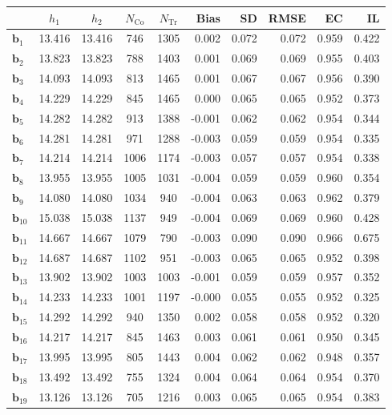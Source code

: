 \documentclass[10pt]{article}
\newcommand{\bb}{\mathbf{b}}
\begin{document}
\begin{table}[p]
    \centering
\begin{tabular}{lccccrrrrr}
\toprule\toprule
 & $h_1$ & $h_2$ & $N_{\mathrm{Co}}$ & $N_{\mathrm{Tr}}$ & Bias & SD & RMSE & EC & IL \\
\midrule
$\bb_{1}$ & 13.416 & 13.416 & 746 & 1305 & 0.002 & 0.072 & 0.072 & 0.959 & 0.422 \\
$\bb_{2}$ & 13.823 & 13.823 & 788 & 1403 & 0.001 & 0.069 & 0.069 & 0.955 & 0.403 \\
$\bb_{3}$ & 14.093 & 14.093 & 813 & 1465 & 0.001 & 0.067 & 0.067 & 0.956 & 0.390 \\
$\bb_{4}$ & 14.229 & 14.229 & 845 & 1465 & 0.000 & 0.065 & 0.065 & 0.952 & 0.373 \\
$\bb_{5}$ & 14.282 & 14.282 & 913 & 1388 & -0.001 & 0.062 & 0.062 & 0.954 & 0.344 \\
$\bb_{6}$ & 14.281 & 14.281 & 971 & 1288 & -0.003 & 0.059 & 0.059 & 0.954 & 0.335 \\
$\bb_{7}$ & 14.214 & 14.214 & 1006 & 1174 & -0.003 & 0.057 & 0.057 & 0.954 & 0.338 \\
$\bb_{8}$ & 13.955 & 13.955 & 1005 & 1031 & -0.004 & 0.059 & 0.059 & 0.960 & 0.354 \\
$\bb_{9}$ & 14.080 & 14.080 & 1034 & 940 & -0.004 & 0.063 & 0.063 & 0.962 & 0.379 \\
$\bb_{10}$ & 15.038 & 15.038 & 1137 & 949 & -0.004 & 0.069 & 0.069 & 0.960 & 0.428 \\
$\bb_{11}$ & 14.667 & 14.667 & 1079 & 790 & -0.003 & 0.090 & 0.090 & 0.966 & 0.675 \\
$\bb_{12}$ & 14.687 & 14.687 & 1102 & 951 & -0.003 & 0.065 & 0.065 & 0.952 & 0.398 \\
$\bb_{13}$ & 13.902 & 13.902 & 1003 & 1003 & -0.001 & 0.059 & 0.059 & 0.957 & 0.352 \\
$\bb_{14}$ & 14.233 & 14.233 & 1001 & 1197 & -0.000 & 0.055 & 0.055 & 0.952 & 0.325 \\
$\bb_{15}$ & 14.292 & 14.292 & 940 & 1350 & 0.002 & 0.058 & 0.058 & 0.952 & 0.320 \\
$\bb_{16}$ & 14.217 & 14.217 & 845 & 1463 & 0.003 & 0.061 & 0.061 & 0.950 & 0.345 \\
$\bb_{17}$ & 13.995 & 13.995 & 805 & 1443 & 0.004 & 0.062 & 0.062 & 0.948 & 0.357 \\
$\bb_{18}$ & 13.492 & 13.492 & 755 & 1324 & 0.004 & 0.064 & 0.064 & 0.954 & 0.370 \\
$\bb_{19}$ & 13.126 & 13.126 & 705 & 1216 & 0.003 & 0.065 & 0.065 & 0.954 & 0.383 \\

\end{tabular}
\end{table}
\end{document}

